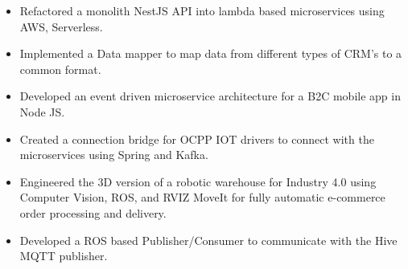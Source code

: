 \documentclass[10pt,a4paper,ragged2e]{classes/altacv}
\begin{document}
\tagline{ }

\begin{fullwidth}
\makecvheader
\end{fullwidth}




\begin{itemize}
\item Refactored a monolith NestJS API into lambda based microservices using AWS, Serverless.
\item Implemented a Data mapper to map data from different types of CRM's to a common format.
\end{itemize}

\divider

\begin{itemize}
\item Developed an event driven microservice architecture for a B2C mobile app in Node JS.
\item Created a connection bridge for OCPP IOT drivers to connect with the microservices using Spring and Kafka.
\end{itemize}

\divider

\begin{itemize}
\item Engineered the 3D version of a robotic warehouse for Industry 4.0 using Computer Vision, ROS, and RVIZ
MoveIt for fully automatic e-commerce order processing and delivery.
\smallskip
\item Developed a ROS based Publisher/Consumer to communicate with the Hive MQTT publisher.
\end{itemize}


\end{document}
